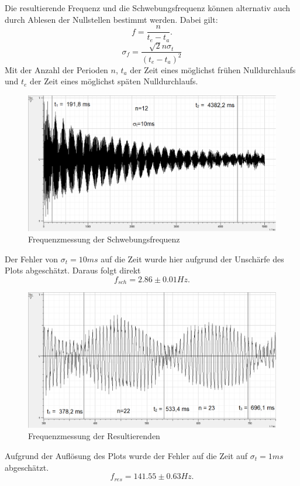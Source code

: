 \documentclass[12pt,a4paper]{article}
\begin{document}
Die resultierende Frequenz und die Schwebungsfrequenz können alternativ auch durch Ablesen der Nullstellen bestimmt werden. Dabei gilt:
\begin{equation}
f=\frac{n}{t_e-t_a}.
\end{equation}
\begin{equation}
\sigma_f=\frac{\sqrt{2}n\sigma_t}{(t_e-t_a)^2}
\end{equation}
Mit der Anzahl der Perioden $n$, $t_a$ der Zeit eines möglichst frühen Nulldurchlaufs und $t_e$ der Zeit eines möglichst späten Nulldurchlaufs. 
\begin{figure}[H]
\centering
\includegraphics[scale=0.5]{schwebung/Schwebung_ganz_bearb.png}
\caption{Frequenzmessung der Schwebungsfrequenz}
\end{figure}
Der Fehler von $\sigma_t=10ms$ auf die Zeit wurde hier aufgrund der Unschärfe des Plots abgeschätzt. Daraus folgt direkt
\begin{equation}
f_{sch}=2.86 \pm 0.01 Hz.
\end{equation}

\begin{figure}[H]
\centering
\includegraphics[scale=0.5]{schwebung/Schwebung_zaehlen_2.png}
\caption{Frequenzmessung der Resultierenden}
\end{figure}
Aufgrund der Auflösung des Plots wurde der Fehler auf die  Zeit auf $\sigma_t=1ms$ abgeschätzt.
\begin{equation}
f_{res}=141.55 \pm 0.63Hz.
\end{equation}
\end{document}
